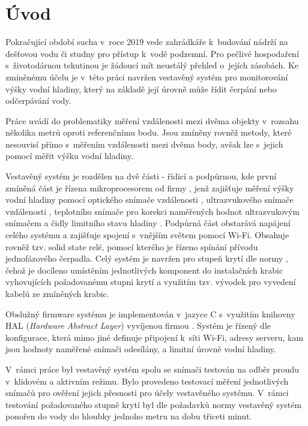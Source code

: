 \chapter{Úvod}

    Pokračující období sucha v~roce 2019 vede zahrádkáře k~budování nádrží na dešťovou vodu či studny pro přístup k~vodě podzemní. Pro pečlivé hospodaření s~životodárnou tekutinou je žádoucí mít neustálý přehled o~jejích zásobách. Ke zmíněnému účelu je v~této práci navržen vestavěný systém pro monitorování výšky vodní hladiny, který na základě její úrovně může řídit čerpání nebo odčerpávání vody.

    Práce uvádí do problematiky měření vzdálenosti mezi dvěma objekty v~rozsahu několika metrů oproti referenčnímu bodu. Jsou zmíněny rovněž metody, které nesouvisí přímo s~měřením vzdálenosti mezi dvěma body, avšak lze s~jejich pomocí měřit výšku vodní hladiny.

    Vestavěný systém je rozdělen na dvě části - řídicí a podpůrnou, kde první zmíněná část je řízena mikroprocesorem  od firmy , jenž zajišťuje měření výšky vodní hladiny pomocí optického snímače vzdálenosti , ultrazvukového snímače vzdálenosti , teplotního snímače  pro korekci naměřených hodnot ultrazvukovým snímačem a čidly limitního stavu hladiny . Podpůrná část obstarává napájení celého systému a zajišťuje spojení s~vnějším světem pomocí Wi-Fi. Obsahuje rovněž tzv. solid state relé, pomocí kterého je řízeno spínání přívodu jednofázového čerpadla. Celý systém je navržen pro stupeň krytí  dle normy , čehož je docíleno umístěním jednotlivých komponent do instalačních krabic vyhovujících požadovanému stupni krytí a využitím tzv. vývodek pro vyvedení kabelů ze zmíněných krabic.

    Obslužný firmware systému je implementován v~jazyce C s~využitím knihovny HAL (\textit{Hardware Abstract Layer}) vyvíjenou firmou . Systém je řízený dle konfigurace, která mimo jiné definuje připojení k~síti Wi-Fi, adresy serveru, kam jsou hodnoty naměřené snímači odesílány, a limitní úrovně vodní hladiny. 

    V~rámci práce byl vestavěný systém spolu se snímači testován na odběr proudu v~klidovém a aktivním režimu. Bylo provedeno testovací měření jednotlivých snímačů pro ověření jejich přesnosti pro účely vestavěného systému. V~rámci testování požadovaného stupně krytí  byl dle požadavků normy  vestavěný systém ponořen do vody do hloubky jednoho metru na dobu třiceti minut.

